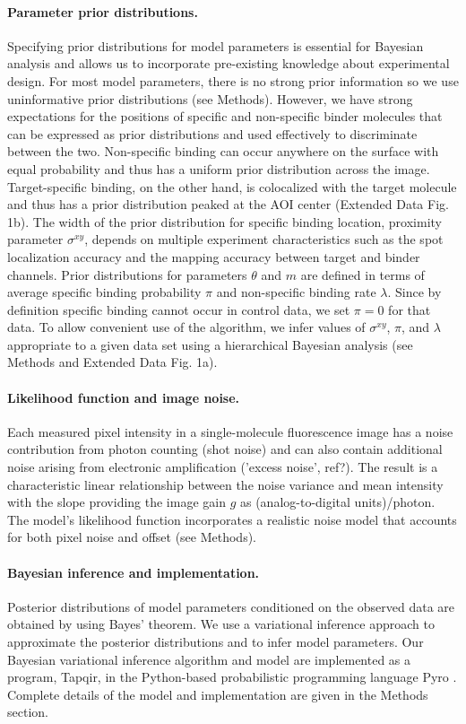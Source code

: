 \paragraph{Parameter prior distributions.}
Specifying prior distributions for model parameters is essential for Bayesian analysis and allows us to incorporate pre-existing knowledge about experimental design. For most model parameters, there is no strong prior information so we use uninformative prior distributions (see Methods). However, we have strong expectations for the positions of specific and non-specific binder molecules that can be expressed as prior distributions and used effectively to discriminate between the two. Non-specific binding can occur anywhere on the surface with equal probability and thus has a uniform prior distribution across the image. Target-specific binding, on the other hand, is colocalized with the target molecule and thus has a prior distribution peaked at the AOI center (Extended Data Fig. 1b). The width of the prior distribution for specific binding location, proximity parameter $\sigma^{xy}$, depends on multiple experiment characteristics such as the spot localization accuracy and the mapping accuracy between target and binder channels. Prior distributions for parameters $\theta$ and $m$ are defined in terms of average specific binding probability $\pi$ and non-specific binding rate $\lambda$. Since by definition specific binding cannot occur in control data, we set $\pi = 0$ for that data. To allow convenient use of the algorithm, we infer values of $\sigma^{xy}$, $\pi$, and $\lambda$ appropriate to a given data set using a hierarchical Bayesian analysis (see Methods and Extended Data Fig. 1a). 

\paragraph{Likelihood function and image noise.}
Each measured pixel intensity in a single-molecule fluorescence image has a noise contribution from photon counting (shot noise) and can also contain additional noise arising from electronic amplification ('excess noise', ref?). The result is  a characteristic linear relationship between the noise variance and  mean intensity with the slope providing the image gain $g$ as (analog-to-digital units)/photon. The model's likelihood function incorporates a realistic noise model that accounts for both pixel noise and offset (see Methods). 

\paragraph{Bayesian inference and implementation.}
Posterior distributions of model parameters conditioned on the observed data are obtained by using Bayes' theorem. We use a variational inference approach to approximate the posterior distributions and to infer model parameters. Our Bayesian variational inference algorithm and model are implemented as a program, Tapqir, in the Python-based probabilistic programming language Pyro \cite{Bingham2019-qy}. Complete details of the model and implementation are given in the Methods section.


